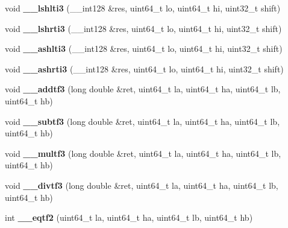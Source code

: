 \begin{DoxyCompactItemize}
void {\bfseries \+\_\+\+\_\+lshlti3} (\+\_\+\+\_\+int128 \&res, uint64\+\_\+t lo, uint64\+\_\+t hi, uint32\+\_\+t shift)
\item 
\mbox{\label{group__compiler_ga7785ea89d0105220b2e52ecf5f315caa}} 
void {\bfseries \+\_\+\+\_\+lshrti3} (\+\_\+\+\_\+int128 \&res, uint64\+\_\+t lo, uint64\+\_\+t hi, uint32\+\_\+t shift)
\item 
\mbox{\label{group__compiler_ga2d057451f581f4d1cec929cf76f0d610}} 
void {\bfseries \+\_\+\+\_\+ashlti3} (\+\_\+\+\_\+int128 \&res, uint64\+\_\+t lo, uint64\+\_\+t hi, uint32\+\_\+t shift)
\item 
\mbox{\label{group__compiler_ga54e1751b41448b01e519dfeb63733ab8}} 
void {\bfseries \+\_\+\+\_\+ashrti3} (\+\_\+\+\_\+int128 \&res, uint64\+\_\+t lo, uint64\+\_\+t hi, uint32\+\_\+t shift)
\item 
\mbox{\label{group__compiler_ga873d982bbd7493a9975dd88e923d85ed}} 
void {\bfseries \+\_\+\+\_\+addtf3} (long double \&ret, uint64\+\_\+t la, uint64\+\_\+t ha, uint64\+\_\+t lb, uint64\+\_\+t hb)
\item 
\mbox{\label{group__compiler_ga6f055bf1366a170f3f01b28cc0a723dc}} 
void {\bfseries \+\_\+\+\_\+subtf3} (long double \&ret, uint64\+\_\+t la, uint64\+\_\+t ha, uint64\+\_\+t lb, uint64\+\_\+t hb)
\item 
\mbox{\label{group__compiler_ga74a992741c2e037447d9953bb5cce333}} 
void {\bfseries \+\_\+\+\_\+multf3} (long double \&ret, uint64\+\_\+t la, uint64\+\_\+t ha, uint64\+\_\+t lb, uint64\+\_\+t hb)
\item 
\mbox{\label{group__compiler_gad8133b5d6604ce3bab0adf8e0d44bf5f}} 
void {\bfseries \+\_\+\+\_\+divtf3} (long double \&ret, uint64\+\_\+t la, uint64\+\_\+t ha, uint64\+\_\+t lb, uint64\+\_\+t hb)
\item 
\mbox{\label{group__compiler_ga11b0c275233be847ecba192c3d4bd50f}} 
int {\bfseries \+\_\+\+\_\+eqtf2} (uint64\+\_\+t la, uint64\+\_\+t ha, uint64\+\_\+t lb, uint64\+\_\+t hb)
\item 
\mbox{\label{group__compiler_ga01fedff23a9e5324dab56c77a4ce90fa}} 

\end{DoxyCompactItemize}
